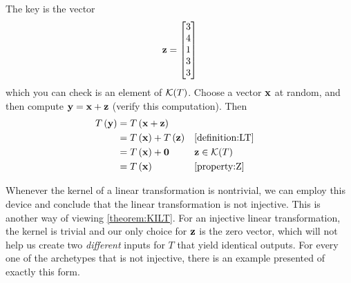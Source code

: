 \documentclass{ximera}
\begin{document}
\begin{example}
The key is the vector
\[
\mathbf{z}=\begin{bmatrix}3\\4\\1\\3\\3\end{bmatrix}
\]
which you can check is an element of $\mathcal{K}\!\left(T\right)$.  Choose a vector $\mathbf{x}$ at random, and then compute $\mathbf{y}=\mathbf{x}+\mathbf{z}$ (verify this computation).  Then
\begin{align*}
T\left(\mathbf{y}\right)&=T\left(\mathbf{x}+\mathbf{z}\right)\\
&=T\left(\mathbf{x}\right)+T\left(\mathbf{z}\right)&&\ref{definition:LT}\\
&=T\left(\mathbf{x}\right)+\mathbf{0}&&\mathbf{z}\in\mathcal{K}\!\left(T\right)\\
&=T\left(\mathbf{x}\right)&&\ref{property:Z}
\end{align*}

Whenever the kernel of a linear transformation is nontrivial, we can employ this device and conclude that the linear transformation is not injective.  This is another way of viewing \ref{theorem:KILT}.  For an injective linear transformation, the kernel is trivial and our only choice for $\mathbf{z}$ is the zero vector, which will not help us create two \textit{different} inputs for $T$ that yield identical outputs.  For every one of the archetypes that is not injective, there is an example presented of exactly this form.

\end{example}
\end{document}
